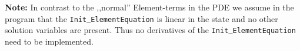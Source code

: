 \textbf{Note:} In contrast to the ,,normal'' Element-terms in the PDE we assume in the program 
that the \texttt{Init\underline{ }ElementEquation} is linear in the state and no other solution variables are present.
Thus no derivatives of the \texttt{Init\underline{ }ElementEquation} need to be implemented.
